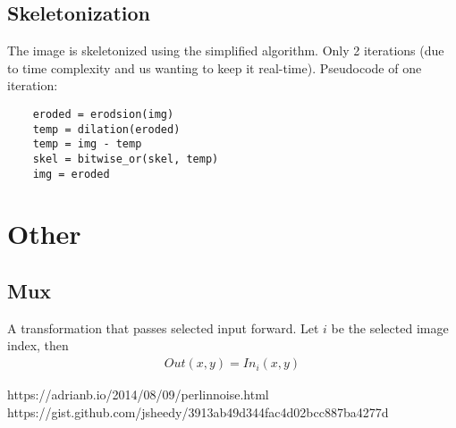 \documentclass{article}
\begin{document}
\subsection{Skeletonization}
The image is skeletonized using the simplified algorithm\cite{skel}. Only 2 iterations (due to time complexity and us wanting to keep it real-time). Pseudocode of one iteration:
\begin{lstlisting}
    eroded = erodsion(img) 
    temp = dilation(eroded)
    temp = img - temp
    skel = bitwise_or(skel, temp)
    img = eroded
\end{lstlisting}
\section{Other}
\subsection{Mux}
A transformation that passes selected input forward. Let $i$ be the selected image index, then
\begin{gather*}
    Out(x,y) = In_i(x,y)
\end{gather*}

            
\begin{thebibliography}{3}                     
https://adrianb.io/2014/08/09/perlinnoise.html
https://gist.github.com/jsheedy/3913ab49d344fac4d02bcc887ba4277d
\end{thebibliography}
\end{document}
